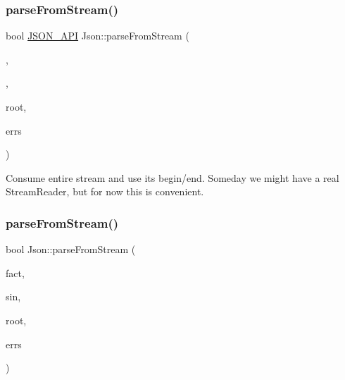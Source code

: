 \hypertarget{namespace_json_aab0cf1ecf81d1aeca12be2a416a84352}{}\label{namespace_json_aab0cf1ecf81d1aeca12be2a416a84352} 
\subsubsection{\texorpdfstring{parse\+From\+Stream()}{parseFromStream()}\hspace{0.1cm}{\footnotesize\ttfamily [1/2]}}
{\footnotesize\ttfamily bool \hyperlink{config_8h_a1d61ffde86ce1a18fd83194ff0d9a206}{J\+S\+O\+N\+\_\+\+A\+PI} Json\+::parse\+From\+Stream (\begin{DoxyParamCaption}\item[{\hyperlink{class_json_1_1_char_reader_1_1_factory}{Char\+Reader\+::\+Factory} const \&}]{,  }\item[{\hyperlink{config_8h_a15f2f70b2ce0a2abd0f8112393dbc4de}{J\+S\+O\+N\+C\+P\+P\+\_\+\+I\+S\+T\+R\+E\+AM} \&}]{,  }\item[{\hyperlink{class_json_1_1_value}{Value} $\ast$}]{root,  }\item[{std\+::string $\ast$}]{errs }\end{DoxyParamCaption})}

Consume entire stream and use its begin/end. Someday we might have a real Stream\+Reader, but for now this is convenient. \hypertarget{namespace_json_a38f903cfdb57a6c4e86a7dcc42f3712c}{}\label{namespace_json_a38f903cfdb57a6c4e86a7dcc42f3712c} 
\subsubsection{\texorpdfstring{parse\+From\+Stream()}{parseFromStream()}\hspace{0.1cm}{\footnotesize\ttfamily [2/2]}}
{\footnotesize\ttfamily bool Json\+::parse\+From\+Stream (\begin{DoxyParamCaption}\item[{\hyperlink{class_json_1_1_char_reader_1_1_factory}{Char\+Reader\+::\+Factory} const \&}]{fact,  }\item[{\hyperlink{config_8h_a15f2f70b2ce0a2abd0f8112393dbc4de}{J\+S\+O\+N\+C\+P\+P\+\_\+\+I\+S\+T\+R\+E\+AM} \&}]{sin,  }\item[{\hyperlink{class_json_1_1_value}{Value} $\ast$}]{root,  }\item[{\hyperlink{config_8h_a1e723f95759de062585bc4a8fd3fa4be}{J\+S\+O\+N\+C\+P\+P\+\_\+\+S\+T\+R\+I\+NG} $\ast$}]{errs }\end{DoxyParamCaption})}



